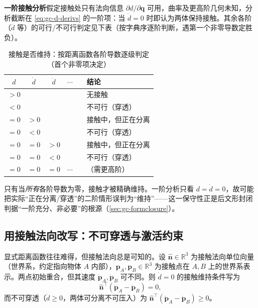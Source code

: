 \begin{definition}[一阶接触分析]
\label{def:gc-first-order}
\textbf{一阶接触分析}假定接触处只有法向信息 $\partial d/\partial\mathbf{q}$ 可用，曲率及更高阶几何未知，分析截断在 \cref{eq:gc-d-derivs} 的一阶项：当 $\dot d=0$ 时即认为两体保持接触。其余各阶（$\ddot d$ 等）的可行/不可行判定见下表（按字典序逐阶判断，遇第一个非零导数定胜负）。
\end{definition}

\begin{table}[H]\centering\small
\caption{接触是否维持：按距离函数各阶导数逐级判定（首个非零项决定）}
\label{tab:gc-contact-derivatives}
\begin{tabular}{cccccl}
\toprule
$d$ & $\dot d$ & $\ddot d$ & $\cdots$ & & 结论 \\
\midrule
$>0$ & & & & & 无接触 \\
$<0$ & & & & & 不可行（穿透） \\
$=0$ & $>0$ & & & & 接触中，但正在分离 \\
$=0$ & $<0$ & & & & 不可行（穿透） \\
$=0$ & $=0$ & $>0$ & & & 接触中，但正在分离 \\
$=0$ & $=0$ & $<0$ & & & 不可行（穿透） \\
$=0$ & $=0$ & $=0$ & $\cdots$ & & （需更高阶） \\
\bottomrule
\end{tabular}
\end{table}

\noindent 只有当\emph{所有}各阶导数为零，接触才被精确维持。一阶分析只看 $d=\dot d=0$，故可能把实际“正在分离/穿透”的二阶情形误判为“维持”——这一保守性正是后文形封闭判据“一阶充分、非必要”的根源（\cref{sec:gc-formclosure}）。

\subsection{用接触法向改写：不可穿透与激活约束}
\label{sec:gc-impenetrability}

显式距离函数往往难得，但接触法向总是可知的。设 $\hat{\mathbf{n}}\in\mathbb{R}^3$ 为接触法向单位向量（世界系，约定指向物体 $A$ 内部），$\mathbf{p}_A,\mathbf{p}_B\in\mathbb{R}^3$ 为接触点在 $A,B$ 上的世界系表示。两点初始重合，但其速度 $\dot{\mathbf{p}}_A,\dot{\mathbf{p}}_B$ 可不同。则 $\dot d=0$ 的接触维持条件写为
\begin{equation}
  \hat{\mathbf{n}}^\top(\dot{\mathbf{p}}_A-\dot{\mathbf{p}}_B)=0,
  \label{eq:gc-dot-pn}
\end{equation}
而不可穿透（$\dot d\ge0$，两体可分离不可压入）为 $\hat{\mathbf{n}}^\top(\dot{\mathbf{p}}_A-\dot{\mathbf{p}}_B)\ge0$。

